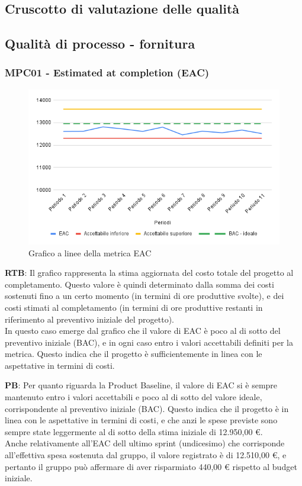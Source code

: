 \documentclass[10pt]{article}
\begin{document}
\begin{justify}
\section{Cruscotto di valutazione delle qualità}
\label{sec:cruscotto}
\subsection{Qualità di processo - fornitura}
\label{sec:QdP_fornitura}
\subsubsection{MPC01 - Estimated at completion (EAC)}%

\begin{figure}[H]
  \centering
  \includegraphics[width=0.9\linewidth]{EAC.png}
  \caption{Grafico a linee della metrica EAC}
  \label{fig:EACchart}
\end{figure}


\textbf{RTB}: Il grafico rappresenta la stima aggiornata del costo totale del progetto al completamento. Questo valore è quindi determinato dalla somma 
dei costi sostenuti fino a un certo momento (in termini di ore produttive svolte), e dei costi stimati al completamento (in termini di ore produttive 
restanti in riferimento al preventivo iniziale del progetto).\\ 
In questo caso emerge dal grafico che il valore di EAC è poco al di sotto del preventivo iniziale (BAC), e in ogni caso entro i valori accettabili definiti
per la metrica. Questo indica che il progetto è sufficientemente in linea con le aspettative in termini di costi.

\noindent
\textbf{PB}: Per quanto riguarda la Product Baseline, il valore di EAC si è sempre mantenuto entro i valori accettabili e poco al di sotto del valore ideale,
corrispondente al preventivo iniziale (BAC). Questo indica che il progetto è in linea con le aspettative in termini di costi, e che anzi le spese previste sono sempre
state leggermente al di sotto della stima iniziale di 12.950,00 €.\\
Anche relativamente all'EAC dell ultimo sprint (undicesimo) che corrisponde all'effettiva spesa sostenuta dal gruppo, il valore registrato è di 12.510,00 €, e pertanto
il gruppo può affermare di aver risparmiato 440,00 € rispetto al budget iniziale.\\



\end{justify}
\end{document}
